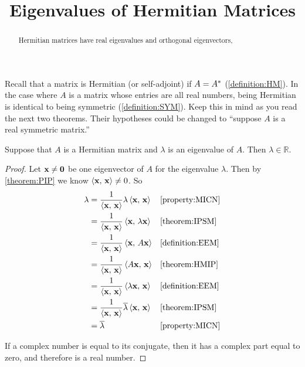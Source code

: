 \documentclass{ximera}
\title{Eigenvalues of Hermitian Matrices}
\begin{document}
\begin{abstract}
  Hermitian matrices have real eigenvalues and orthogonal eigenvectors,
\end{abstract}
\maketitle

Recall that a matrix is Hermitian (or self-adjoint) if $A=A^\ast$ (\ref{definition:HM}).  In the case where $A$ is a matrix whose entries are all real numbers, being Hermitian is identical to being symmetric (\ref{definition:SYM}).  Keep this in mind as you read the next two theorems.  Their hypotheses could be changed to ``suppose $A$ is a real symmetric matrix.''

\begin{theorem}
\label{theorem:HMRE}

Suppose that $A$ is a Hermitian matrix and $\lambda$ is an eigenvalue of $A$.  Then $\lambda\in{\mathbb R}$.

\begin{proof}
Let $\mathbf{x}\neq\mathbf{0}$ be one eigenvector of $A$ for the eigenvalue $\lambda$.   Then by \ref{theorem:PIP} we know $\left\langle\mathbf{x},\,\mathbf{x}\right\rangle\neq 0$.  So
\begin{align*}
\lambda
&=\frac{1}{\left\langle\mathbf{x},\,\mathbf{x}\right\rangle}\lambda\left\langle\mathbf{x},\,\mathbf{x}\right\rangle
&&\ref{property:MICN}\\
&=\frac{1}{\left\langle\mathbf{x},\,\mathbf{x}\right\rangle}\left\langle\mathbf{x},\,\lambda\mathbf{x}\right\rangle
&&\ref{theorem:IPSM}\\
&=\frac{1}{\left\langle\mathbf{x},\,\mathbf{x}\right\rangle}\left\langle\mathbf{x},\,A\mathbf{x}\right\rangle
&&\ref{definition:EEM}\\
&=\frac{1}{\left\langle\mathbf{x},\,\mathbf{x}\right\rangle}\left\langle A\mathbf{x},\,\mathbf{x}\right\rangle
&&\ref{theorem:HMIP}\\
&=\frac{1}{\left\langle\mathbf{x},\,\mathbf{x}\right\rangle}\left\langle\lambda\mathbf{x},\,\mathbf{x}\right\rangle
&&\ref{definition:EEM}\\
&=\frac{1}{\left\langle\mathbf{x},\,\mathbf{x}\right\rangle}\overline{\lambda}\left\langle\mathbf{x},\,\mathbf{x}\right\rangle
&&\ref{theorem:IPSM}\\
&=\overline{\lambda}
&&\ref{property:MICN}
\end{align*}


If a complex number is equal to its conjugate, then it has a complex
part equal to zero, and therefore is a real number.

\end{proof}
\end{theorem}
\end{document}
